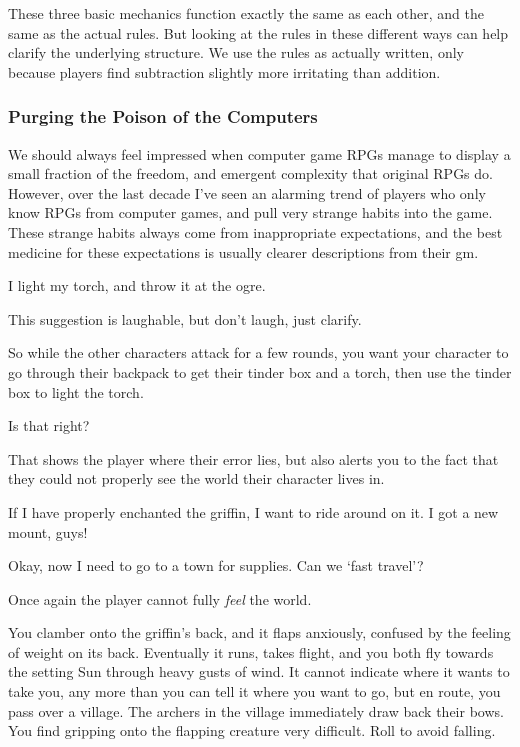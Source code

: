 \begin{multicols}{2}
\begin{itemize}
\end{itemize}

\noindent
These three basic mechanics function exactly the same as each other, and the same as the actual rules.
But looking at the rules in these different ways can help clarify the underlying structure.
We use the rules as actually written, only because players find subtraction slightly more irritating than addition.

\subsubsection{Purging the Poison of the Computers}

We should always feel impressed when computer game RPGs manage to display a small fraction of the freedom, and emergent complexity that original RPGs do.
However, over the last decade I've seen an alarming trend of players who only know RPGs from computer games, and pull very strange habits into the game.
These strange habits always come from inappropriate expectations, and the best medicine for these expectations is usually clearer descriptions from their \gls{gm}.

\begin{boxtext}
  I light my torch, and throw it at the ogre.
\end{boxtext}

This suggestion is laughable, but don't laugh, just clarify.

\begin{speechtext}
  So while the other characters attack for a few rounds, you want your character to go through their backpack to get their tinder box and a torch, then use the tinder box to light the torch.

  Is that right?
\end{speechtext}

That shows the player where their error lies, but also alerts you to the fact that they could not properly see the world their character lives in.

\begin{boxtext}
  If I have properly enchanted the griffin, I want to ride around on it.
  I got a new mount, guys!

  Okay, now I need to go to a town for supplies.
  Can we `fast travel'?
\end{boxtext}

Once again the player cannot fully \emph{feel} the world.

\begin{speechtext}
  You clamber onto the griffin's back, and it flaps anxiously, confused by the feeling of weight on its back.
  Eventually it runs, takes flight, and you both fly towards the setting Sun through heavy gusts of wind.
  It cannot indicate where it wants to take you, any more than you can tell it where you want to go, but en route, you pass over a \gls{village}.
  The archers in the \gls{village} immediately draw back their bows.
  You find gripping onto the flapping creature very difficult.
  Roll  to avoid falling.
  

\end{speechtext}
\end{multicols}
